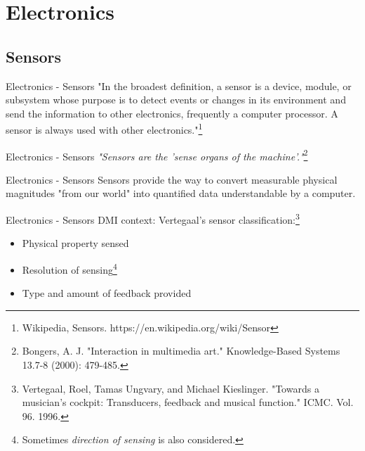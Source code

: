 \documentclass{beamer}
\begin{document}
\section{Electronics}

\subsection{Sensors}

\begin{frame}{Electronics - Sensors}
    "In the broadest definition, a sensor is a device, module, or subsystem whose purpose is to detect events or changes in its environment and send the information to other electronics, frequently a computer processor. A sensor is always used with other electronics."\footnote{Wikipedia, Sensors. https://en.wikipedia.org/wiki/Sensor}
\end{frame}

\begin{frame}{Electronics - Sensors}
    \textit{"Sensors are the 'sense organs of the machine'."}\footnote{Bongers, A. J. "Interaction in multimedia art." Knowledge-Based Systems 13.7-8 (2000): 479-485.}
\end{frame}

\begin{frame}{Electronics - Sensors}
    Sensors provide the way to convert measurable physical magnitudes "from our world" into quantified data understandable by a computer.
\end{frame}

\begin{frame}{Electronics - Sensors}
    DMI context: Vertegaal's sensor classification:\footnote{Vertegaal, Roel, Tamas Ungvary, and Michael Kieslinger. "Towards a musician's cockpit: Transducers, feedback and musical function." ICMC. Vol. 96. 1996.}
    \begin{itemize}
        \item Physical property sensed
        \item Resolution of sensing\footnote{Sometimes \textit{direction of sensing} is also considered.}
        \item Type and amount of feedback provided
    \end{itemize}
\end{frame}
\end{document}
